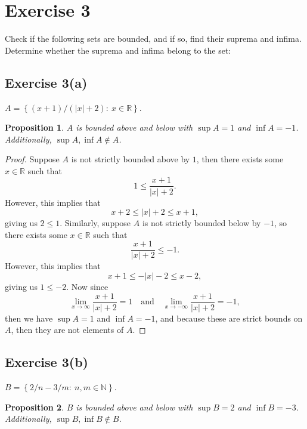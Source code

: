 \documentclass[12pt]{article}
\newtheorem{proposition}{Proposition}
\newenvironment{problem}
    {\begin{lrbox}{\mybox}\begin{minipage}{\textwidth-10pt}}
    {\end{minipage}\end{lrbox}\framebox[6.5in]{\usebox{\mybox}}}
\newcommand{\isp}[1]{\quad\text{#1}\quad}
\newcommand{\R}{\mathbb{R}}
\begin{document}
\section*{Exercise 3}
\begin{problem}
    Check if the following sets are bounded, and if so, find their suprema and infima. Determine whether the suprema and infima belong to the set:
\end{problem}

\subsection*{Exercise 3(a)}
\begin{problem}
    $A = \left \{ (x+1)/(|x|+2):\ x \in \mathbb{R} \right \}$.
\end{problem}

\begin{proposition}
    $A$ is bounded above and below with $\sup A = 1$ and $\inf A = -1$. Additionally, $\sup A, \inf A \notin A$.
\end{proposition}

\begin{proof}
    Suppose $A$ is not strictly bounded above by $1$, then there exists some $x\in\R$ such that
    \[1 \leq \frac{x+1}{|x|+2}.\]
    However, this implies that
    \[x + 2 \leq |x|+2 \leq x+1,\]
    giving us $2\leq1$. Similarly, suppose $A$ is not strictly bounded below by $-1$, so there exists some $x\in\R$ such that
    \[\frac{x+1}{|x|+2} \leq-1.\]
    However, this implies that
    \[x+1 \leq-|x|-2 \leq x -2,\]
    giving us $1\leq-2$. Now since
    \[\lim_{x\to\infty}\frac{x+1}{|x|+2} = 1 \isp{and} \lim_{x\to-\infty}\frac{x+1}{|x|+2} = -1,\]
    then we have $\sup A=1$ and $\inf A=-1$, and because these are strict bounds on $A$, then they are not elements of $A$.
    
\end{proof}

\subsection*{Exercise 3(b)}
\begin{problem}
    $B = \left \{ 2/n - 3/m:\ n,m\in \mathbb{N} \right \}$.
\end{problem}

\begin{proposition}
    $B$ is bounded above and below with $\sup B = 2$ and $\inf B = -3$. Additionally, $\sup B, \inf B \notin B$.
\end{proposition}
\end{document}
